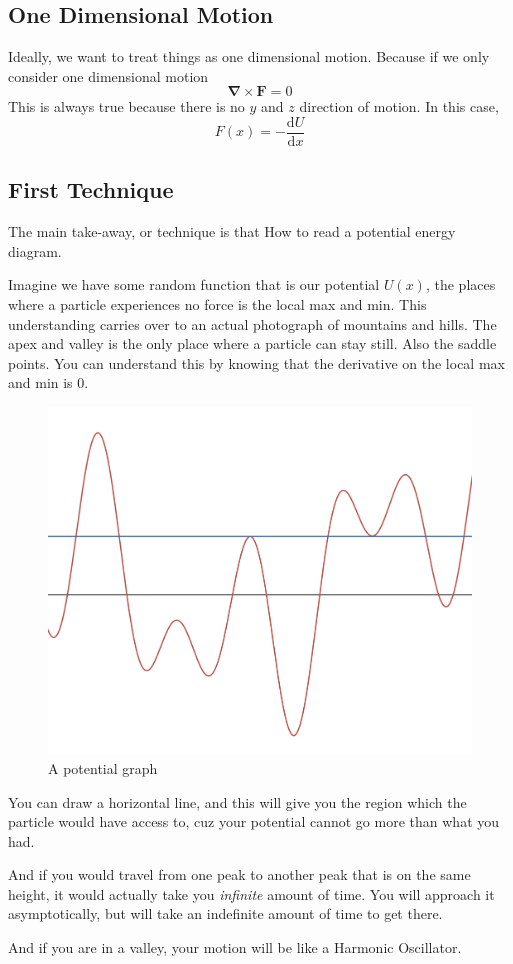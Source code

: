 \documentclass[12pt]{article}
\newcommand{\curl}{\boldsymbol{\nabla}\times}
\newcommand{\dydx}[2]{\frac{\text{d} #1}{\text{d} #2}}
\begin{document}
\subsection{One Dimensional Motion}
Ideally, we want to treat things as one dimensional motion. Because if we only consider one dimensional motion
\[
\curl \mathbf{F} = 0
\]
This is always true because there is no $y$ and $z$ direction of motion. In this case, 
\[
F(x) = -\dydx{U}{x}
\]
\subsection{First Technique}
The main take-away, or technique is that How to read a potential energy diagram.

Imagine we have some random function that is our potential $U(x)$, the places where a particle experiences no force is the local max and min. This understanding carries over to an actual photograph of mountains and hills. The apex and valley is the only place where a particle can stay still. Also the saddle points. You can understand this by knowing that the derivative on the local max and min is $0$. 

\begin{figure}[!h]
    \centering
    \includegraphics[width=0.5\linewidth]{Pictures//NotesPic/PotentialPic.png}
    \caption{A potential graph}
    \label{fig:potential_pic}
\end{figure}

You can draw a horizontal line, and this will give you the region which the particle would have access to, cuz your potential cannot go more than what you had.

And if you would travel from one peak to another peak that is on the same height, it would actually take you \textit{infinite} amount of time. You will approach it asymptotically, but will take an indefinite amount of time to get there. 

And if you are in a valley, your motion will be like a Harmonic Oscillator. 
\end{document}
